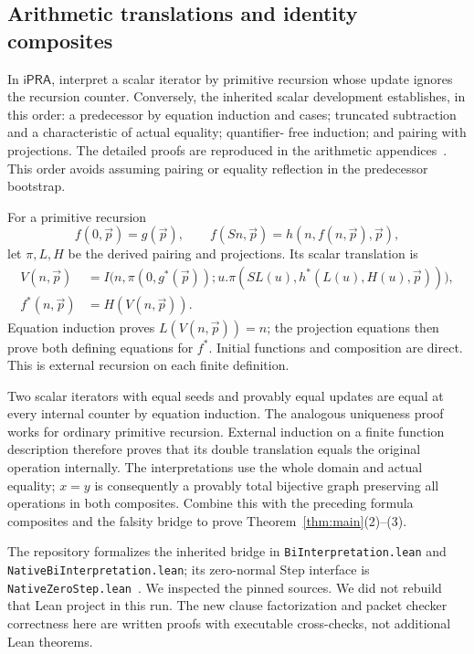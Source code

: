 \documentclass[11pt]{article}
\theoremstyle{definition}
\newcommand{\ipra}{\mathsf{iPRA}}
\begin{document}
\subsection{Arithmetic translations and identity composites}

In $\ipra$, interpret a scalar iterator by primitive recursion whose update
ignores the recursion counter. Conversely, the inherited scalar development
establishes, in this order: a predecessor by equation induction and cases;
truncated subtraction and a characteristic of actual equality; quantifier-
free induction; and pairing with projections. The detailed proofs are
reproduced in the arithmetic appendices~\cite{erasure,forward,progress}.
This order avoids assuming pairing or equality reflection in the predecessor
bootstrap.

For a primitive recursion
\[
 f(0,\vec p)=g(\vec p),\qquad
 f(Sn,\vec p)=h(n,f(n,\vec p),\vec p),
\]
let $\pi,L,H$ be the derived pairing and projections. Its scalar translation is
\[
\begin{aligned}
 V(n,\vec p)&=I\bigl(n,\pi(0,g^*(\vec p));
 u.\pi(SL(u),h^*(L(u),H(u),\vec p))\bigr),\\
 f^*(n,\vec p)&=H(V(n,\vec p)).
\end{aligned}
\]
Equation induction proves $L(V(n,\vec p))=n$; the projection equations then
prove both defining equations for $f^*$. Initial functions and composition
are direct. This is external recursion on each finite definition.

Two scalar iterators with equal seeds and provably equal updates are equal
at every internal counter by equation induction. The analogous uniqueness
proof works for ordinary primitive recursion. External induction on a
finite function description therefore proves that its double translation
equals the original operation internally. The interpretations use the
whole domain and actual equality; $x=y$ is consequently a provably total
bijective graph preserving all operations in both composites. Combine this
with the preceding formula composites and the falsity bridge to prove
Theorem~\ref{thm:main}(2)--(3).

The repository formalizes the inherited bridge in
\nolinkurl{BiInterpretation.lean} and \nolinkurl{NativeBiInterpretation.lean};
its zero-normal Step interface is \nolinkurl{NativeZeroStep.lean}~\cite{biinterp,
nativebi,nativezerostep}. We inspected the pinned sources. We did not rebuild
that Lean project in this run. The new clause factorization and packet
checker correctness here are written proofs with executable cross-checks,
not additional Lean theorems.
\end{document}
